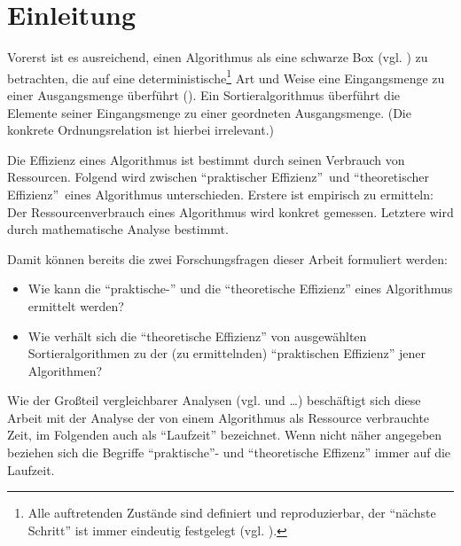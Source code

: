 \chapter*{Einleitung}


Vorerst ist es ausreichend, einen Algorithmus als eine schwarze Box (vgl. \cite{bun1963}) zu betrachten, die auf eine deterministische\footnote{Alle auftretenden Zustände sind definiert und reproduzierbar, der \enquote{nächste Schritt} ist immer eindeutig festgelegt (vgl. \cite[1]{baas2009}).} Art und Weise eine Eingangsmenge zu einer Ausgangsmenge überführt (\cite[5]{clrs2001}). Ein Sortieralgorithmus überführt die Elemente seiner Eingangsmenge zu einer geordneten Ausgangs\-menge\nocit. (Die konkrete Ordnungsrelation ist hierbei irrelevant\nocit.)

Die Effizienz eines Algorithmus ist bestimmt durch seinen Verbrauch von Ressourcen\nocit. Folgend wird zwischen \enquote{praktischer Effizienz}\nocit\ und \enquote{theoretischer Effizienz}\nocit\ eines Algorithmus unterschieden. Erstere ist empirisch zu ermitteln: Der Ressourcenverbrauch eines Algorithmus wird konkret gemessen. Letztere wird durch mathematische Analyse bestimmt.

Damit können bereits die zwei Forschungsfragen dieser Arbeit formuliert werden:
\begin{itemize}
    \item Wie kann die \enquote{praktische-} und die \enquote{theoretische Effizienz} eines Algorithmus ermittelt werden?
    \item Wie verhält sich die \enquote{theoretische Effizienz} von ausgewählten Sortieralgorithmen zu der (zu ermittelnden) \enquote{praktischen Effizienz} jener Algorithmen?
\end{itemize}

Wie der Großteil vergleichbarer Analysen (vgl. \cite[23]{clrs2001} und \cite[58]{sha2011} \ldots\nocit) beschäftigt sich diese Arbeit mit der Analyse der von einem Algorithmus als Ressource verbrauchte Zeit, im Folgenden auch als \enquote{Laufzeit} bezeichnet. Wenn nicht näher angegeben beziehen sich die Begriffe \enquote{praktische}- und \enquote{theoretische Effizenz} immer auf die Laufzeit.

